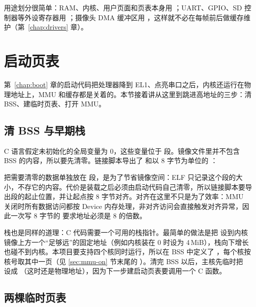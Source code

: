 用途划分很简单：RAM、内核、用户页面和页表本身用 ；UART、GPIO、SD 控制器等外设寄存器用 ；摄像头 DMA 缓冲区用 ，这样就不必在每帧前后做缓存维护（第~\ref{chap:drivers} 章）。

\section{启动页表}
\label{sec:bootpgt}

第~\ref{chap:boot} 章的启动代码把处理器降到 EL1、点亮串口之后，内核还运行在物理地址上，MMU 和缓存都是关着的。本节接着讲从这里到跳进高地址的三步：清 BSS、建临时页表、打开 MMU。

\subsection{清 BSS 与早期栈}

C 语言假定未初始化的全局变量为 0，这些变量位于  段。镜像文件里并不包含 BSS 的内容，所以要先清零。链接脚本导出了  和以 8 字节为单位的 ：


把需要清零的数据单独放在  段，是为了节省镜像空间：ELF 只记录这个段的大小，不存它的内容。代价是装载之后必须由启动代码自己清零，所以链接脚本要导出段的起止位置，并让起点按 8 字节对齐。对齐在这里不只是为了效率：MMU 关闭时所有数据访问都按 Device 内存处理，非对齐访问会直接触发对齐异常，因此一次写 8 字节的  要求地址必须是 8 的倍数。

栈也是同样的道理：C 代码需要一个可用的栈指针。最简单的做法是把  设到内核镜像上方一个“足够远”的固定地址（例如内核装在 0 时设为 4\,MiB），栈向下增长也碰不到内核。本项目要支持四个核同时运行，所以在 BSS 中定义了 ，每个核按核号取其中一页（见 \ref{sec:mmu-on} 节末尾的 ）。清完 BSS 以后，主核先临时把  设成 （这时还是物理地址），因为下一步建启动页表要调用一个 C 函数。

\subsection{两棵临时页表}


